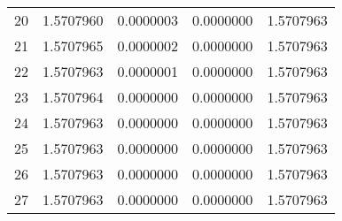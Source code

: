 \documentclass{mywork}
\begin{document}
\begin{aufgabe}
\begin{enumerate}[a)]
\begin{table}[h]
\begin{tabular}{c|c|c|c|c}
20 & 1.5707960 & 0.0000003 & 0.0000000 & 1.5707963\\
21 & 1.5707965 & 0.0000002 & 0.0000000 & 1.5707963\\
22 & 1.5707963 & 0.0000001 & 0.0000000 & 1.5707963\\
23 & 1.5707964 & 0.0000000 & 0.0000000 & 1.5707963\\
24 & 1.5707963 & 0.0000000 & 0.0000000 & 1.5707963\\
25 & 1.5707963 & 0.0000000 & 0.0000000 & 1.5707963\\
26 & 1.5707963 & 0.0000000 & 0.0000000 & 1.5707963\\
27 & 1.5707963 & 0.0000000 & 0.0000000 & 1.5707963\\
				\end{tabular}
			\end{table}
	\end{enumerate}
\end{aufgabe}
\end{document}

